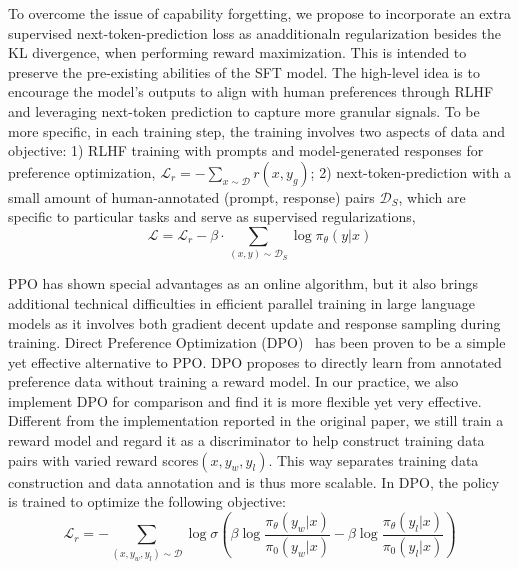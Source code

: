To overcome the issue of capability forgetting, we propose to incorporate an extra supervised next-token-prediction loss as anadditionaln regularization besides the KL divergence, when performing reward maximization. This is intended to preserve the pre-existing abilities of the SFT model. The high-level idea is to encourage the model's outputs to align with human preferences through RLHF and leveraging next-token prediction to capture more granular signals.
To be more specific, in each training step, the training involves two aspects of data and objective: 1) RLHF training with prompts and model-generated responses for preference optimization,
$\mathcal{L}_r=-\sum_{x \sim \mathcal{D}} r(x,y_g)$; 
2) next-token-prediction with a small amount of human-annotated (prompt, response) pairs $\mathcal{D}_{S}$, which are specific to particular tasks and serve as supervised regularizations,
\begin{equation}
\mathcal{L} = \mathcal{L}_{r} - \beta \cdot \sum_{(x,y)\sim \mathcal{D}_{S}} \log \pi_{\theta}(y|x)
\end{equation}

 PPO has shown special advantages as an online algorithm, but it also brings additional technical difficulties in efficient parallel training in large language models as it involves both gradient decent update and response sampling during training.
Direct Preference Optimization (DPO)~\cite{rafailov2023direct} has been proven to be a simple yet effective alternative to PPO. DPO proposes to directly learn from annotated preference data without training a reward model. In our practice, we also implement DPO for comparison and find it is more flexible yet very effective. Different from the implementation reported in the original paper, we still train a reward model and regard it as a discriminator to help construct training data pairs with varied reward scores$(x, y_w, y_l)$. This way separates training data construction and data annotation and is thus more scalable. In DPO, the policy is trained to optimize the following objective:
\begin{equation}
    \mathcal{L}_{r} = -\sum_{(x, y_w, y_l)\sim \mathcal{D}}\log \sigma(\beta \log \frac{\pi_{\theta}(y_w|x)}{\pi_0(y_w|x)} - \beta \log \frac{\pi_{\theta}(y_l|x)}{\pi_0(y_l|x)} )
\end{equation}

